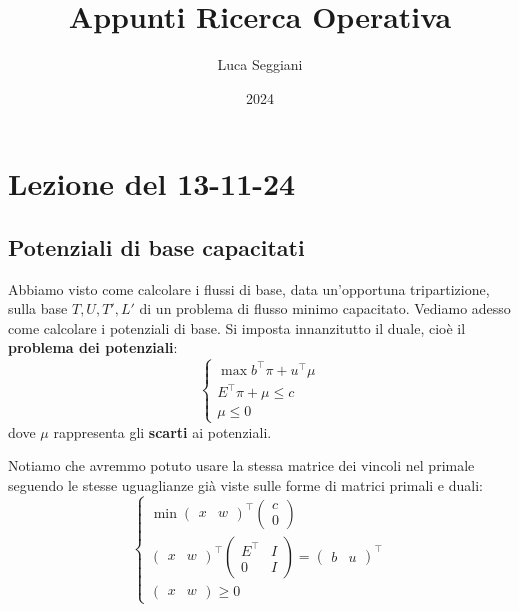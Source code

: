 \documentclass[a4paper,11pt]{article}
\title{Appunti Ricerca Operativa}
\author{Luca Seggiani}
\date{2024}
\begin{document}
\section{Lezione del 13-11-24}

\thispagestyle{empty}
\pagestyle{fancy}

\subsection{Potenziali di base capacitati}
Abbiamo visto come calcolare i flussi di base, data un'opportuna tripartizione, sulla base $T, U, T', L'$ di un problema di flusso minimo capacitato.
Vediamo adesso come calcolare i potenziali di base.
Si imposta innanzitutto il duale, cioè il \textbf{problema dei potenziali}: 
\[
	\begin{cases}
		\max b^\intercal \pi + u^\intercal \mu \\ 
		E^\intercal \pi + \mu \leq c \\ 
		\mu \leq 0
	\end{cases}
\]
dove $\mu$ rappresenta gli \textbf{scarti} ai potenziali. 

Notiamo che avremmo potuto usare la stessa matrice dei vincoli nel primale seguendo le stesse uguaglianze già viste sulle forme di matrici primali e duali:
\[
	\begin{cases}
		\min
		\begin{pmatrix}
			x & w
		\end{pmatrix}^\intercal
		\begin{pmatrix}
			c \\ 0
		\end{pmatrix} \\ 
		\begin{pmatrix}
			x & w
		\end{pmatrix}^\intercal
		\begin{pmatrix}
			E^\intercal & I \\ 
			0 & I 
		\end{pmatrix}
		=
		\begin{pmatrix}
			b & u
		\end{pmatrix}^\intercal \\ 
		\begin{pmatrix}
			x & w
		\end{pmatrix}
		\geq 0
	\end{cases}
\]
\end{document}
